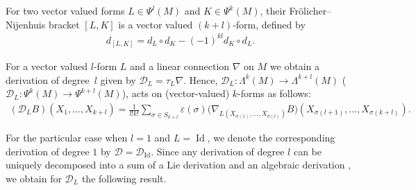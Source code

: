 For two vector valued forms $L\in \Psi^l(M)$ and $K\in \Psi^k(M)$,
their Fr\"olicher--Nijenhuis bracket $[L,K]$ is a vector
valued $(k+l)$-form, def\/ined by
\begin{gather} \label{dlk}
d_{[L,K]}=d_L\circ d_K -(-1)^{kl}d_K\circ d_L.
\end{gather}

For a vector valued $l$-form $L$ and a linear connection $\nabla$
on $M$ we obtain a derivation of degree~$l$ given by ${\mathcal
D}_L=\tau_L \nabla$. Hence, ${\mathcal D}_L: \Lambda^k(M) \to
\Lambda^{k+l}(M)$ (${\mathcal D}_L: \Psi^k(M) \to
\Psi^{k+l}(M)$), acts on (vector-valued) $k$-forms as follows:
\begin{gather} \left({\mathcal
D_L}B\right)(X_1,\dots ,X_{k+l})  = \frac{1}{l!k!}
\sum_{\sigma\in S_{k+l}}
\varepsilon(\sigma)\big(\nabla_{L(X_{\sigma(1)},\dots ,X_{\sigma(l)})}B\big)\left(X_{\sigma(l+1)},\dots ,
X_{\sigma(k+l)}\right). \label{DLlk}
\end{gather}

For the particular case when $l=1$ and $L=\operatorname{Id}$, we
denote the corresponding derivation of degree $1$ by $\mathcal{D} =
\mathcal{D}_{\operatorname{Id}}$.
Since any derivation of degree $l$ can be uniquely
decomposed into a sum of a Lie derivation and an algebraic
derivation \cite[\S~8.3]{KMS93}, we obtain for ${\mathcal D}_L$
the following result.

